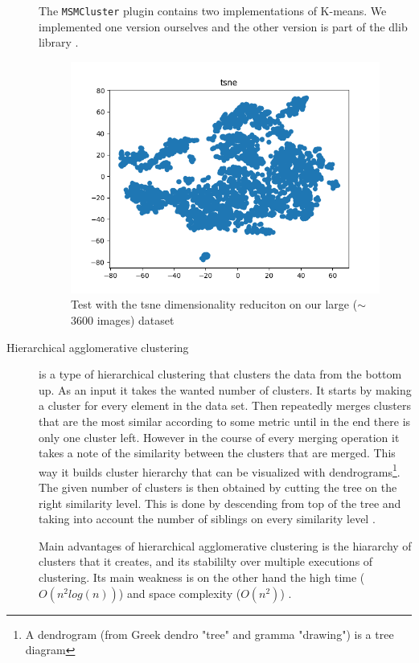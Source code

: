 \documentclass[journal]{vgtc}       %
\begin{document}
\begin{description}
The \verb|MSMCluster| plugin contains two implementations of K-means. We implemented one version ourselves and the other version is part of the dlib library \cite{dlib09}.

\begin{figure}[t]
	\begin{center}
		\includegraphics[width=.75\linewidth]{tsneFull.png}
	\end{center}
	\caption{\label{fig:tsnef} Test with the tsne dimensionality reduciton on our large ($\sim$ 3600 images) dataset}
\end{figure}

\item [Hierarchical agglomerative clustering] is a type of hierarchical clustering that clusters the data from the bottom up. As an input it takes the wanted number of clusters. It starts by making a cluster for every element in the data set. Then repeatedly merges clusters that are the most similar according to some metric until in the end there is only one cluster left. However in the course of every merging operation it takes a note of the similarity between the clusters that are merged. This way it builds cluster hierarchy that can be visualized with dendrograms\footnote{A dendrogram (from Greek dendro "tree" and gramma "drawing") is a tree diagram}. The given number of clusters is then obtained by cutting the tree on the right similarity level. This is done by descending from top of the tree and taking into account the number of siblings on every similarity level \cite{iir}.

Main advantages of hierarchical agglomerative clustering is the hiararchy of clusters that it creates, and its stabililty over multiple executions of clustering. Its main weakness is on the other hand the high time ($O(n^2 log(n))$) and space complexity ($O(n^2)$) \cite{jain1999data}.


\end{description}
\end{document}
